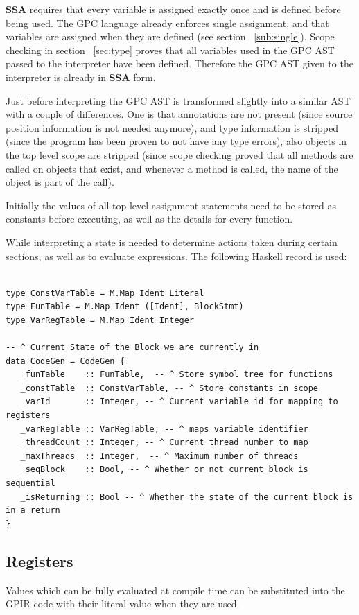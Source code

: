 \textbf{SSA}\cite{sccp, brandis94} 
requires that every variable is assigned exactly once and is defined before being
used. The GPC language already enforces single assignment, and that variables are assigned
when they are defined (see section ~\ref{sub:single}). 
Scope checking in section ~\ref{sec:type} proves that all variables used in
the GPC AST passed to the interpreter have been defined. Therefore the GPC
AST given to the interpreter is already in \textbf{SSA} form.

Just before interpreting the GPC AST is transformed slightly into a similar AST
with a couple of differences. One is that annotations are not present (since source position information
is not needed anymore), and type information is stripped (since the program has been proven to 
not have any type errors), also objects in the top level scope are stripped (since scope checking
proved that all methods are called on objects that exist, and whenever a method is called, the
name of the object is part of the call).

Initially the values of all top level assignment statements need to be stored
as constants before executing, as well as the details for every function.

While interpreting a state is needed to determine actions taken
during certain sections, as well as to evaluate expressions.
The following Haskell record is used:

\begin{lstlisting}[style=myHaskell]

type ConstVarTable = M.Map Ident Literal
type FunTable = M.Map Ident ([Ident], BlockStmt)
type VarRegTable = M.Map Ident Integer

-- ^ Current State of the Block we are currently in
data CodeGen = CodeGen {
   _funTable    :: FunTable,  -- ^ Store symbol tree for functions
   _constTable  :: ConstVarTable, -- ^ Store constants in scope
   _varId       :: Integer, -- ^ Current variable id for mapping to registers
   _varRegTable :: VarRegTable, -- ^ maps variable identifier
   _threadCount :: Integer, -- ^ Current thread number to map
   _maxThreads  :: Integer,  -- ^ Maximum number of threads
   _seqBlock    :: Bool, -- ^ Whether or not current block is sequential
   _isReturning :: Bool -- ^ Whether the state of the current block is in a return
}

\end{lstlisting}


\subsection{Registers}
Values which can be fully evaluated at compile time can be substituted into the
GPIR code with their literal value when they are used.

